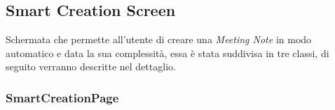 \newpage

\subsection{Smart Creation Screen}
\label{subsec:smart-creation-screen}

Schermata che permette all'utente di creare una \emph{Meeting Note} in modo automatico e data la sua complessità, essa è stata suddivisa in tre classi, di seguito verranno descritte nel dettaglio. \\

\subsubsection*{SmartCreationPage}
\label{subsubsec:smart-creation-page}

